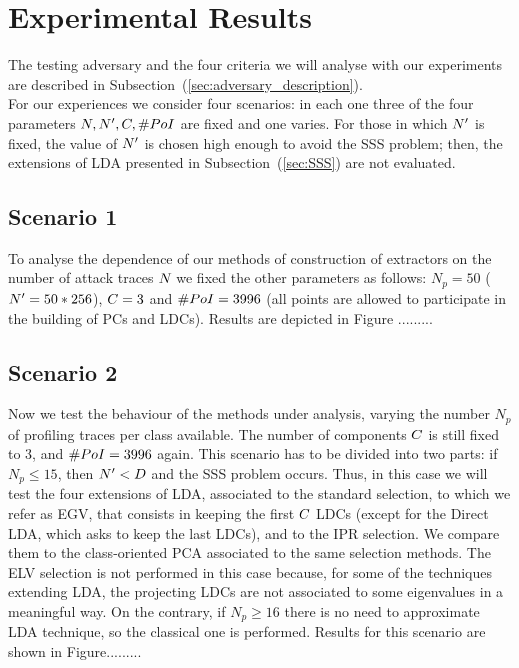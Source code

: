 \section{Experimental Results}

The testing adversary and the four criteria we will analyse with our experiments are described in Subsection~(\ref{sec:adversary_description}). \\
For our experiences we consider four scenarios: in each one three of the four parameters $\numTraces[], \numTraces[]', \newTraceLength, \numPoI$ are fixed and one varies. For those in which $\numTraces[]'$ is fixed, the value of $\numTraces[]'$ is chosen high enough to avoid the SSS problem; then, the extensions of LDA presented in Subsection~(\ref{sec:SSS}) are not evaluated.

\subsection{Scenario 1}
To analyse the dependence of our methods of construction of extractors on the number of attack traces $\numTraces[]$ we fixed the other parameters as follows: $N_p=50$ ($\numTraces[]'=50*256$), $\newTraceLength = 3$ and $\numPoI = 3996$ (all points are allowed to participate in the building of PCs and LDCs). Results are depicted in Figure .........\\


\subsection{Scenario 2}
Now we test the behaviour of the methods under analysis, varying the number $N_p$ of profiling traces per class available. The number of components $\newTraceLength$ is still fixed to 3, and $\numPoI=3996$ again. This scenario has to be divided into two parts: if $N_p\leq 15$, then $\numTraces[]'<\traceLength$ and the SSS problem occurs. Thus, in this case we will test the four extensions of LDA, associated to the standard selection, to which we refer as EGV, that consists in keeping the first $\newTraceLength$ LDCs (except for the Direct LDA, which asks to keep the last LDCs), and to the IPR selection.  We compare them to the class-oriented PCA associated to the same selection methods. The ELV selection is not performed in this case because, for some of the techniques extending LDA, the projecting LDCs are not associated to some eigenvalues in a meaningful way. On the contrary, if $N_p\geq 16$ there is no need to approximate LDA technique, so the classical one is performed. Results for this scenario are shown in Figure.........




